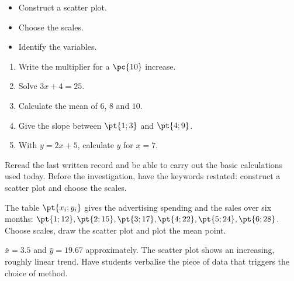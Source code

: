 \begin{objectives}\begin{itemize}\item Construct a scatter plot.\item Choose the scales.\item Identify the variables.\end{itemize}\end{objectives}
\begin{fluency}\begin{enumerate}\item Write the multiplier for a $\pc{10}$ increase. \item Solve $3x+4=25$. \item Calculate the mean of $6$, $8$ and $10$. \item Give the slope between $\pt{1;3}$ and $\pt{4;9}$. \item With $y=2x+5$, calculate $y$ for $x=7$. \end{enumerate}\end{fluency}
\begin{prerequisites}Reread the last written record and be able to carry out the basic calculations used today. Before the investigation, have the keywords restated: construct a scatter plot and choose the scales.\end{prerequisites}

\begin{activity}
The table $\pt{x_i;y_i}$ gives the advertising spending and the sales over six months: $\pt{1;12},\pt{2;15},\pt{3;17},\pt{4;22},\pt{5;24},\pt{6;28}$. Choose scales, draw the scatter plot and plot the mean point.
\begin{center}\end{center}
\end{activity}
\begin{solution}$\bar x=\num{3,5}$ and $\bar y=\num{19,67}$ approximately. The scatter plot shows an increasing, roughly linear trend. Have students verbalise the piece of data that triggers the choice of method.\end{solution}

